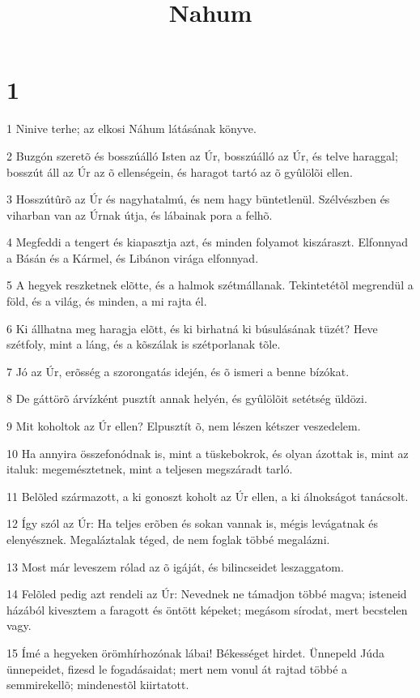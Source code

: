 

\title{Nahum}


\chapter{1}

\par 1 Ninive terhe; az elkosi Náhum látásának könyve.
\par 2 Buzgón szeretõ és bosszúálló Isten az Úr, bosszúálló az Úr, és telve haraggal; bosszút áll az Úr az õ ellenségein, és haragot tartó az õ gyûlölõi ellen.
\par 3 Hosszútûrõ az Úr és nagyhatalmú, és nem hagy büntetlenül. Szélvészben és viharban van az Úrnak útja, és lábainak pora a felhõ.
\par 4 Megfeddi a tengert és kiapasztja azt, és minden folyamot kiszáraszt. Elfonnyad a Básán és a Kármel, és Libánon virága elfonnyad.
\par 5 A hegyek reszketnek elõtte, és a halmok szétmállanak. Tekintetétõl megrendül a föld, és a világ, és minden, a mi rajta él.
\par 6 Ki állhatna meg haragja elõtt, és ki birhatná ki búsulásának tüzét? Heve szétfoly, mint a láng, és a kõszálak is szétporlanak tõle.
\par 7 Jó az Úr, erõsség a szorongatás idején,  és õ ismeri a benne bízókat.
\par 8 De gáttörõ árvízként pusztít annak helyén, és gyûlölõit setétség üldözi.
\par 9 Mit koholtok az Úr ellen? Elpusztít õ, nem lészen kétszer veszedelem.
\par 10 Ha annyira összefonódnak is, mint a tüskebokrok, és olyan ázottak is, mint az italuk: megemésztetnek, mint a teljesen megszáradt tarló.
\par 11 Belõled származott, a ki gonoszt koholt az Úr ellen, a ki álnokságot tanácsolt.
\par 12 Így szól az Úr: Ha teljes erõben és sokan vannak is, mégis levágatnak és elenyésznek. Megaláztalak téged, de nem foglak többé megalázni.
\par 13 Most már leveszem rólad az õ igáját, és bilincseidet leszaggatom.
\par 14 Felõled pedig azt rendeli az Úr: Nevednek ne támadjon többé magva; isteneid házából kivesztem a faragott és öntött képeket; megásom sírodat, mert becstelen vagy.
\par 15 Ímé a hegyeken örömhírhozónak lábai! Békességet hirdet. Ünnepeld Júda ünnepeidet, fizesd le fogadásaidat; mert nem vonul át rajtad többé a  semmirekellõ; mindenestõl kiirtatott.


